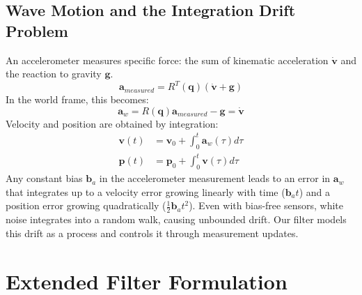 \documentclass[11pt,letterpaper]{article}
\begin{document}
\subsection{Wave Motion and the Integration Drift Problem}
An accelerometer measures specific force: the sum of kinematic acceleration $\dot{\bm{v}}$ and the reaction to gravity $\bm{g}$.
\begin{equation}
\bm{a}_{measured} = R^T(\bm{q})(\dot{\bm{v}} + \bm{g})
\end{equation}
In the world frame, this becomes:
\begin{equation}
\bm{a}_{w} = R(\bm{q}) \bm{a}_{measured} - \bm{g} = \dot{\bm{v}}
\end{equation}
Velocity and position are obtained by integration:
\begin{align}
\bm{v}(t) &= \bm{v}_0 + \int_0^t \bm{a}_{w}(\tau)  d\tau \\
\bm{p}(t) &= \bm{p}_0 + \int_0^t \bm{v}(\tau)  d\tau
\end{align}
Any constant bias $\bm{b}_a$ in the accelerometer measurement leads to an error in $\bm{a}_w$ that integrates up to a velocity error growing linearly with time ($\bm{b}_a t$) and a position error growing quadratically ($\frac{1}{2}\bm{b}_a t^2$). Even with bias-free sensors, white noise integrates into a random walk, causing unbounded drift. Our filter models this drift as a process and controls it through measurement updates.

\section{Extended Filter Formulation}
\label{sec:formulation}
\end{document}
